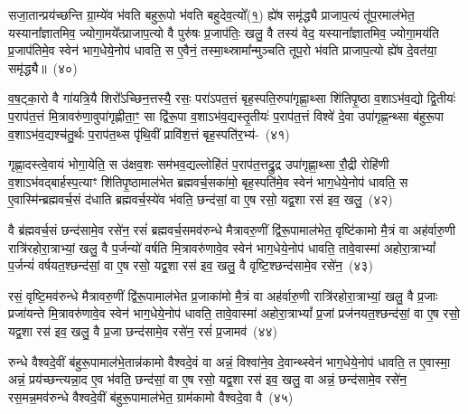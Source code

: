 सजा॒तान्प्रय॑च्छन्ति ग्रा॒म्ये॑व भ॑वति बहुरू॒पो भ॑वति बहुदेव॒त्यो᳚(१॒) ह्ये॑ष समृ॑द्ध्यै प्राजाप॒त्यं तू॑प॒रमा\-ल॑भेत॒ यस्याना᳚ज्ञातमिव॒ ज्योगा॒मये᳚त्प्राजाप॒त्यो वै पुरु॑षः प्र॒जा\-प॑तिः॒ खलु॒ वै तस्य॑ वेद॒ यस्याना᳚ज्ञातमिव॒ ज्योगा॒मय॑ति प्र॒जा\-प॑तिमे॒व स्वेन॑ भाग॒धेये॒नोप॑ धावति॒ स ए॒वैनं॒ तस्मा॒थ्स्रामा᳚न्मुञ्चति तूप॒रो भ॑वति प्राजाप॒त्यो ह्ये॑ष दे॒वत॑या॒ समृ॑द्ध्यै॥~(४०)

{\anuvakamend[{अ॒स्मा॒ इन्द्र॑मे॒वैष स॑जा॒ता विश्वा॑ने॒व दे॒वान्थ्स्वेन॑ भाग॒धेये॒नोप॑ धावति॒ त ए॒वास्मै᳚ प्राजाप॒त्यो हि त्रीणि॑ च}]}%

व॒ष॒ट्का॒रो वै गा॑यत्रि॒यै शिरो᳚\-ऽच्छिन॒त्तस्यै॒ रसः॒ परा॑\-ऽपत॒त्तं बृह॒स्पति॒रुपा॑गृह्णा॒थ्सा शि॑तिपृ॒ष्ठा व॒शा\-ऽभ॑व॒द्यो द्वि॒तीयः॑ प॒राप॑त॒त्तं मि॒त्रावरु॑णा॒वुपा॑गृह्णीता॒ꣳ॒ सा द्वि॑रू॒पा व॒शा\-ऽभ॑व॒द्यस्तृ॒तीयः॑ प॒राप॑त॒त्तं विश्वे॑ दे॒वा उपा॑गृह्ण॒न्थ्सा ब॑हुरू॒पा व॒शा\-ऽभ॑व॒द्यश्च॑तु॒र्थः प॒राप॑त॒थ्स पृ॑थि॒वीं प्रावि॑श॒त्तं बृह॒स्पति॑र॒भ्य॑-~(४१)

गृह्णा॒दस्त्वे॒वायं भोगा॒येति॒ स उ॑क्षव॒शः सम॑भव॒द्यल्लोहि॑तं प॒राप॑त॒त्तद्रु॒द्र उपा॑गृह्णा॒थ्सा रौ॒द्री रोहि॑णी व॒शा\-ऽभ॑व\-द्बार्\mbox{}हस्प॒त्याꣳ शि॑तिपृ॒ष्ठामाल॑भेत ब्रह्मवर्च॒सका॑मो॒ बृह॒स्पति॑मे॒व स्वेन॑ भाग॒धेये॒नोप॑ धावति॒ स ए॒वास्मि॑न्ब्रह्म\-वर्च॒सं द॑धाति ब्रह्मवर्च॒स्ये॑व भ॑वति॒ छन्द॑सां॒ वा ए॒ष रसो॒ यद्व॒शा रस॑ इव॒ खलु॒~(४२)

वै ब्र॑ह्मवर्च॒सं छन्द॑सामे॒व रसे॑न॒ रसं॑ ब्रह्मवर्च॒समव॑\-रुन्धे मैत्रावरु॒णीं द्वि॑रू॒पामा\-ल॑भेत॒ वृष्टि॑कामो मै॒त्रं वा अह॑र्वारु॒णी रात्रि॑रहोरा॒त्राभ्यां॒ खलु॒ वै प॒र्जन्यो॑ वर्\mbox{}षति मि॒त्रावरु॑णावे॒व स्वेन॑ भाग॒धेये॒नोप॑ धावति॒ तावे॒वास्मा॑ अहोरा॒त्रा\-भ्यां᳚ प॒र्जन्यं॑ वर्\mbox{}षयत॒श्छन्द॑सां॒ वा ए॒ष रसो॒ यद्व॒शा रस॑ इव॒ खलु॒ वै वृष्टि॒श्छन्द॑सामे॒व रसे॑न॒~(४३)

रसं॒ वृष्टि॒मव॑\-रुन्धे मैत्रावरु॒णीं द्वि॑रू॒पामाल॑भेत प्र॒जाका॑मो मै॒त्रं वा अह॑र्वारु॒णी रात्रि॑रहोरा॒त्राभ्यां॒ खलु॒ वै प्र॒जाः प्रजा॑यन्ते मि॒त्रावरु॑णावे॒व स्वेन॑ भाग॒धेये॒नोप॑ धावति॒ तावे॒वास्मा॑ अहोरा॒त्रा\-भ्यां᳚ प्र॒जां प्रज॑नयत॒श्छन्द॑सां॒ वा ए॒ष रसो॒ यद्व॒शा रस॑ इव॒ खलु॒ वै प्र॒जा छन्द॑सामे॒व रसे॑न॒ रसं॑ प्र॒जामव॑~(४४)

रुन्धे वैश्वदे॒वीं ब॑हुरू॒पामाल॑भे॒तान्न॑कामो वैश्वदे॒वं वा अन्नं॒ विश्वा॑ने॒व दे॒वान्थ्स्वेन॑ भाग॒धेये॒नोप॑ धावति॒ त ए॒वास्मा॒ अन्नं॒ प्रय॑च्छन्त्यन्ना॒द ए॒व भ॑वति॒ छन्द॑सां॒ वा ए॒ष रसो॒ यद्व॒शा रस॑ इव॒ खलु॒ वा अन्नं॒ छन्द॑सामे॒व रसे॑न॒ रस॒मन्न॒मव॑\-रुन्धे वैश्वदे॒वीं ब॑हुरू॒पामा\-ल॑भेत॒ ग्राम॑कामो वैश्वदे॒वा वै~(४५)

